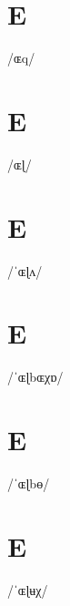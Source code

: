 \documentclass[10pt,a4paper,twoside]{book}
\begin{document}
\section*{E}

\begin{multicols}{3}
 {/ɶq/} {}
\end{multicols}

\section*{E}

\begin{multicols}{3}
 {/ɶɭ/} {}
\end{multicols}

\section*{E}

\begin{multicols}{3}
 {/ˈɶɭʌ/} {}
\end{multicols}

\section*{E}

\begin{multicols}{3}
 {/ˈɶɭbɶχɒ/} {}
\end{multicols}

\section*{E}

\begin{multicols}{3}
 {/ˈɶɭbɵ/} {}
\end{multicols}

\section*{E}

\begin{multicols}{3}
 {/ˈɶɭʉχ/} {}
\end{multicols}
\end{document}
